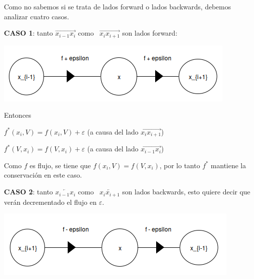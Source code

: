 \documentclass[10pt,a4paper]{article}
\begin{document}
Como no sabemos si se trata de lados forward o lados backwards, debemos analizar cuatro casos.

\textbf{CASO 1}: tanto $\overrightarrow{x_{i-1}x_{i}}$ como  $\overrightarrow{x_{i}x_{i+1}}$ son lados forward:

\begin{center}

    \begin{adjustbox}{max size={\textwidth}{\textheight}}
        \includegraphics{definitions/f_estrella_2.png}
        \end{adjustbox}
    
\end{center}

Entonces

\begin{center}
$f^*(x_i, V) = f(x_i, V) + \varepsilon$ (a causa del lado $\overrightarrow{x_{i}x_{i+1}}$)
\end{center}

\begin{center}
$f^*(V, x_i) = f(V, x_i) + \varepsilon$ (a causa del lado $\overrightarrow{x_{i-1}x_{i}}$)
\end{center}

Como $f$ es flujo, se tiene que $f(x_i, V) = f(V, x_i)$, por lo tanto $f^*$ mantiene la conservación en este caso.

\textbf{CASO 2}: tanto $\overleftarrow{x_{i-1}x_{i}}$ como  $\overleftarrow{x_{i}x_{i+1}}$ son lados backwards, esto quiere decir que verán decrementado el flujo en $\varepsilon$.

\begin{center}

    \begin{adjustbox}{max size={\textwidth}{\textheight}}
        \includegraphics{definitions/f_estrella_3.png}
        \end{adjustbox}
    
\end{center}
\end{document}
